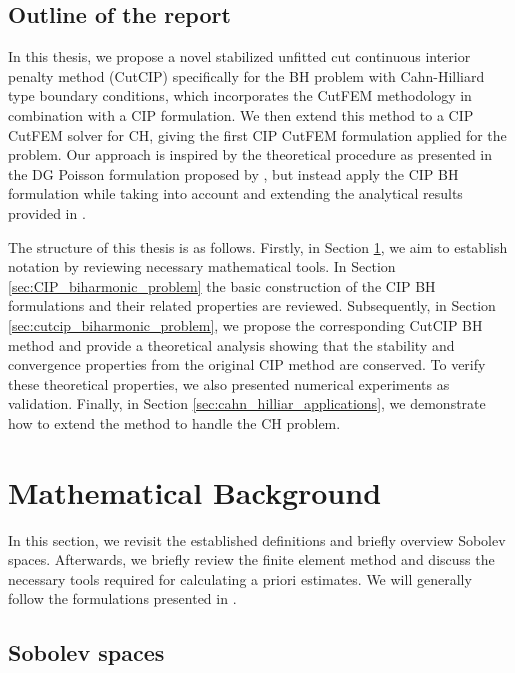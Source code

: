 \documentclass[11pt]{article}
\theoremstyle{remark}
\numberwithin{equation}{section}
\begin{document}
\subsection{Outline of the report}%
\label{sub:outline_of_the_report}
In this thesis, we propose a novel stabilized unfitted cut continuous interior penalty method (CutCIP) specifically for the BH problem with Cahn-Hilliard type boundary conditions, which incorporates the CutFEM methodology in combination with a CIP
formulation. We then extend this method to a CIP CutFEM solver for CH, giving the first CIP CutFEM formulation applied for the problem.
Our approach is inspired by the theoretical
procedure as presented in the DG Poisson formulation proposed by \cite{gurkan2019stabilized}, but instead apply the CIP BH formulation while taking into account and extending the analytical results provided in \cite{feng2007fully, brenner2012quadratic}.

The structure of this thesis is as follows. Firstly, in Section \ref{sec:mathematical_background}, we aim to establish notation by reviewing necessary mathematical tools. In Section \ref{sec:CIP_biharmonic_problem} the basic construction of the CIP
BH formulations and their related properties are reviewed. Subsequently, in Section \ref{sec:cutcip_biharmonic_problem}, we propose the corresponding CutCIP BH method and provide a theoretical analysis showing that the stability and convergence
properties from the original CIP method are conserved. To verify these theoretical properties, we also presented numerical experiments as validation. Finally, in Section \ref{sec:cahn_hilliar_applications}, we demonstrate how to extend the method to handle the CH problem.




\section{Mathematical Background}%
\label{sec:mathematical_background}

In this section, we revisit the established definitions and briefly overview Sobolev spaces. Afterwards, we briefly review the finite element method and discuss the necessary tools required for calculating a priori estimates. We will
generally follow the formulations presented in \cite{pietro2012, ErnGuermond2021}.


\subsection{Sobolev spaces}%
\label{sub:notation}
\end{document}
